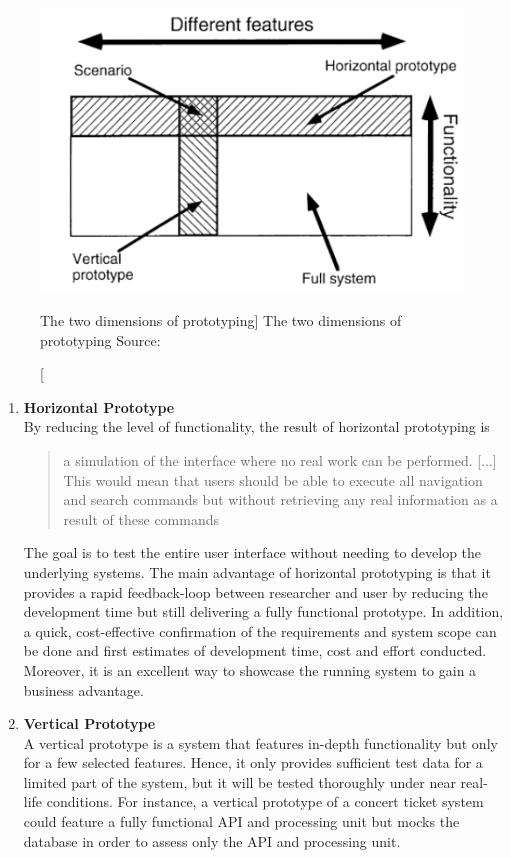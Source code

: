     \begin{figure}[ht]
        \includegraphics[width=0.7\linewidth]{images/methodology/nielsenProto.PNG}\centering
        \caption
        [The two dimensions of prototyping]
        {The two dimensions of prototyping Source: \cite{Nielsen1993UsabilityEngineering}}
    \end{figure}
    
    \begin{enumerate}
        \item \textbf{Horizontal Prototype}\\
            By reducing the level of functionality, the result of horizontal prototyping is \blockquote{a simulation of the interface where no real work can be performed. [...] This would mean that users should be able to execute all navigation and search commands but without retrieving any real information as a result of these commands}.\autocite{Nielsen1993UsabilityEngineering} The goal is to test the entire user interface without needing to develop the underlying systems. The main advantage of horizontal prototyping is that it provides a rapid feedback-loop between researcher and user by reducing the development time but still delivering a fully functional prototype. In addition, a quick, cost-effective confirmation of the requirements and system scope can be done and first estimates of development time, cost and effort conducted. Moreover, it is an excellent way to showcase the running system to gain a business advantage.\autocite{Nielsen1993UsabilityEngineering}
        \item \textbf{Vertical Prototype}\\
            A vertical prototype is a system that features in-depth functionality but only for a few selected features. Hence, it only provides sufficient test data for a limited part of the system, but it will be tested thoroughly under near real-life conditions. For instance, a vertical prototype of a concert ticket system could feature a fully functional API and processing unit but mocks the database in order to assess only the API and processing unit. 
    \end{enumerate}
    
